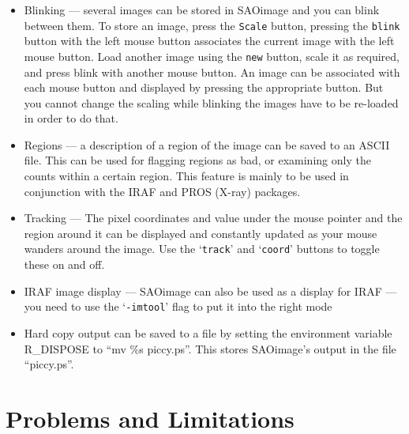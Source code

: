\begin{itemize}

\item{Blinking --- several images can be stored in SAOimage and you can blink
between them. To store an image, press the {\tt Scale} button,
pressing the {\tt blink} button with the left mouse button associates
the current image with the left mouse button. Load another image
using the {\tt new} button, scale it as required, and press blink with
another mouse button. An image can be associated with each mouse
button and displayed by pressing the appropriate button. But you cannot
change the scaling while blinking the images have to be re-loaded in
order to do that.}

\item{Regions --- a description of a region of the image can be saved to an
ASCII file. This can be used for flagging regions as bad, or examining only
the counts within a certain region. This feature is mainly to be used in
conjunction with the IRAF and PROS (X-ray) packages.}

\item{Tracking --- The pixel coordinates and value under the mouse pointer and
the region around it can be displayed and constantly updated as your mouse
wanders around the image. Use  the `{\tt track}' and `{\tt coord}' buttons to
toggle these on and off.}

\item{IRAF image display --- SAOimage can also be used as a display for IRAF
--- you need to use the `{\tt -imtool}' flag to put it into the right mode}

\item{Hard copy output can be saved to a file by setting the environment 
variable R\_DISPOSE to ``mv \%s piccy.ps''. This stores SAOimage's 
output in the file ``piccy.ps''.}

\end{itemize}

\section{Problems and Limitations}

